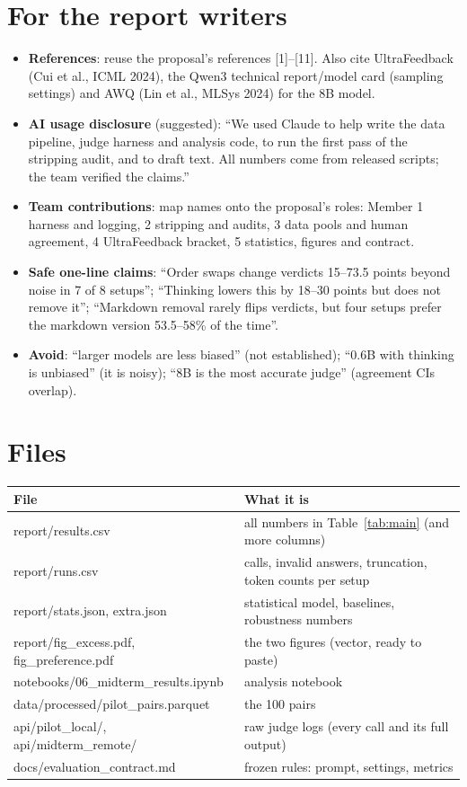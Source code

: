 \documentclass[10.5pt]{article}
\begin{document}
\section{For the report writers}
\begin{itemize}
\item \textbf{References}: reuse the proposal's references [1]--[11]. Also cite UltraFeedback (Cui et al., ICML
2024), the Qwen3 technical report/model card (sampling settings) and AWQ (Lin et al., MLSys 2024) for the 8B model.
\item \textbf{AI usage disclosure} (suggested): ``We used Claude to help write the data pipeline, judge harness and
analysis code, to run the first pass of the stripping audit, and to draft text. All numbers come from released
scripts; the team verified the claims.''
\item \textbf{Team contributions}: map names onto the proposal's roles: Member 1 harness and logging, 2 stripping
and audits, 3 data pools and human agreement, 4 UltraFeedback bracket, 5 statistics, figures and contract.
\item \textbf{Safe one-line claims}: ``Order swaps change verdicts 15--73.5 points beyond noise in 7 of 8 setups'';
``Thinking lowers this by 18--30 points but does not remove it''; ``Markdown removal rarely flips verdicts, but four
setups prefer the markdown version 53.5--58\% of the time''.
\item \textbf{Avoid}: ``larger models are less biased'' (not established); ``0.6B with thinking is unbiased'' (it is
noisy); ``8B is the most accurate judge'' (agreement CIs overlap).
\end{itemize}

\section{Files}
\begin{tabularx}{\linewidth}{>{\ttfamily\raggedright\arraybackslash}p{6.3cm} X}
\toprule
\normalfont\bfseries File & \textbf{What it is} \\
\midrule
report/results.csv & all numbers in Table~\ref{tab:main} (and more columns) \\
report/runs.csv & calls, invalid answers, truncation, token counts per setup \\
report/stats.json, extra.json & statistical model, baselines, robustness numbers \\
report/fig\_excess.pdf, fig\_preference.pdf & the two figures (vector, ready to paste) \\
notebooks/06\_midterm\_results.ipynb & analysis notebook \\
data/processed/pilot\_pairs.parquet & the 100 pairs \\
api/pilot\_local/, api/midterm\_remote/ & raw judge logs (every call and its full output) \\
docs/evaluation\_contract.md & frozen rules: prompt, settings, metrics \\
\bottomrule
\end{tabularx}
\end{document}
